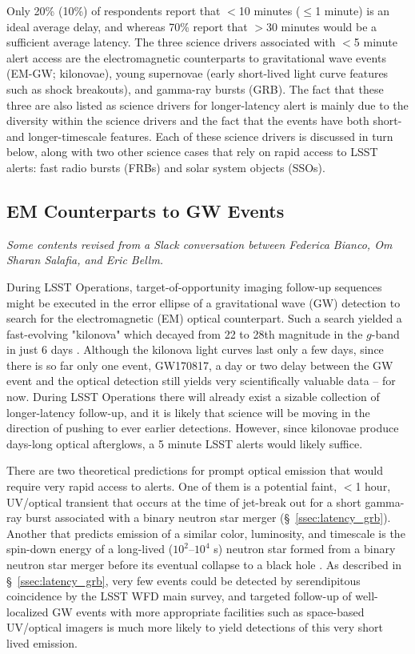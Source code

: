 \documentclass[DM,lsstdraft,authoryear,toc]{lsstdoc}
\begin{document}
Only 20\% (10\%) of respondents report that $<$10 minutes ($\leq$1 minute) is an ideal average delay, and whereas 70\% report that $>$30 minutes would be a sufficient average latency.
The three science drivers associated with $<$5 minute alert access are the electromagnetic counterparts to gravitational wave events (EM-GW; kilonovae), young supernovae (early short-lived light curve features such as shock breakouts), and gamma-ray bursts (GRB).
The fact that these three are also listed as science drivers for longer-latency alert is mainly due to the diversity within the science drivers and the fact that the events have both short- and longer-timescale features.
Each of these science drivers is discussed in turn below, along with two other science cases that rely on rapid access to LSST alerts: fast radio bursts (FRBs) and solar system objects (SSOs).

\subsection{EM Counterparts to GW Events}\label{ssec:latency_emgw}
{\it Some contents revised from a Slack conversation between Federica Bianco, Om Sharan Salafia, and Eric Bellm.}

During LSST Operations, target-of-opportunity imaging follow-up sequences might be executed in the error ellipse of a gravitational wave (GW) detection to search for the electromagnetic (EM) optical counterpart.
Such a search yielded a fast-evolving "kilonova" which decayed from 22 to 28th magnitude in the $g$-band in just 6 days \citep[faster in the bluer and slower in the redder filters][]{2017Sci...358.1559K}.
Although the kilonova light curves last only a few days, since there is so far only one event, GW170817, a day or two delay between the GW event and the optical detection still yields very scientifically valuable data -- for now.
During LSST Operations there will already exist a sizable collection of longer-latency follow-up, and it is likely that science will be moving in the direction of pushing to ever earlier detections.
However, since kilonovae produce days-long optical afterglows, a 5 minute LSST alerts would likely suffice.

There are two theoretical predictions for prompt optical emission that would require very rapid access to alerts.
One of them is a potential faint, $<$1 hour, UV/optical transient that occurs at the time of jet-break out for a short gamma-ray burst associated with a binary neutron star merger (\S~\ref{ssec:latency_grb}).
Another that predicts emission of a similar color, luminosity, and timescale is the spin-down energy of a long-lived ($10^2$--$10^4$ s) neutron star formed from a binary neutron star merger before its eventual collapse to a black hole \citep{2016ApJ...819...15S}.
As described in \S~\ref{ssec:latency_grb}, very few events could be detected by serendipitous coincidence by the LSST WFD main survey, and targeted follow-up of well-localized GW events with more appropriate facilities such as space-based UV/optical imagers is much more likely to yield detections of this very short lived emission.
\end{document}
